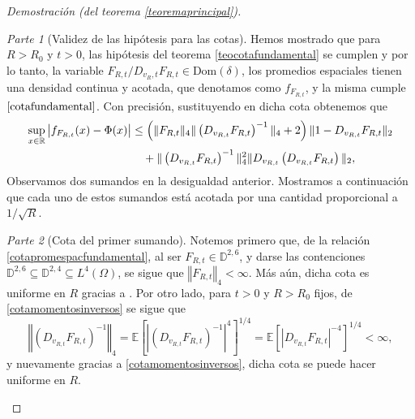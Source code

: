 \documentclass[letterpaper,twoside,12pt]{book}
\newcommand{\R}{\mathbb{R}}
\newcommand{\D}{\mathbb{D}}
\newcommand{\E}{\mathbb{E}}
\newcommand{\1}{\mathds{1}}
\newcommand{\abs}[1]{\left\lvert #1 \right\rvert}
\newcommand{\norm}[1]{\left\Vert #1 \right\Vert}
\theoremstyle{definition}
\theoremstyle{definition}
\theoremstyle{remark}
\newtheorem{proofpart}{Parte}
\theoremstyle{definition}
\theoremstyle{definition}
\theoremstyle{definition}
\theoremstyle{definition}
\theoremstyle{definition}
\begin{document}
\begin{proof}[Demostración (del teorema \ref{teoremaprincipal})]
\begin{proofpart}[Validez de las hipótesis para las cotas]
Hemos mostrado que para $R>R_0$ y $t>0$, las hipótesis del teorema \ref{teocotafundamental} se cumplen y por lo tanto, la variable $F_{R,t}/D_{v_R,t}F_{R,t}\in \text{Dom}(\delta)$, los promedios espaciales tienen una densidad continua y acotada, que denotamos como $f_{F_{R,t}}$, y la misma cumple  $\eqref{cotafundamental}$. Con precisión, sustituyendo en dicha cota obtenemos que 
\begin{align}\label{cotapromespacfundamental}
   \sup_{x\in \R} \abs{f_{F_{R,t}}(x)-\Phi(x)}&\leq \left(\|F_{R,t}\|_4\|\left(D_{v_{R,t}}F_{R,t}\right)^{-1}\|_4+2\right)\|1-D_{v_{R,t}}F_{R,t}\|_2\notag\\
   &\ \ \ +\|\left(D_{v_{R,t}}F_{R,t}\right)^{-1}\|^{2}_4\|D_{v_{R,t}} \left(D_{v_{R,t}}F_{R,t}\right)\|_2,
\end{align}
Observamos dos sumandos en la desigualdad anterior. Mostramos a continuación que cada uno de estos sumandos está acotada por una cantidad proporcional a $1/\sqrt{R}$.
\end{proofpart}
\begin{proofpart}[Cota del primer sumando]
Notemos primero que, de la relación \eqref{cotapromespacfundamental}, al ser $F_{R,t}\in \D^{2,6}$, y darse las contenciones $\D^{2,6}\subseteq \D^{2,4}\subseteq{L^{4}}(\Omega)$, se sigue que $\norm{F_{R,t}}_4<\infty$. Más aún, dicha cota es uniforme en $R$ gracias a \label{cotaunif}. Por otro lado, para $t>0$ y $R>R_0$ fijos, de \eqref{cotamomentosinversos} se sigue que 
\begin{equation}\label{cotapromespacmomentosinversos}
   \norm{(D_{v_{R,t}}F_{R,t})^{-1}}_4=\E\left[\abs{\left(D_{v_{R,t}}F_{R,t}\right)^{-1}}^{4}\right]^{1/4}=\E\left[\abs{D_{v_{R,t}}F_{R,t}}^{-4}\right]^{1/4}<\infty,
\end{equation}
y nuevamente gracias a \ref{cotamomentosinversos}, dicha cota se puede hacer uniforme en $R$. 


\end{proofpart}
\end{proof}
\end{document}
